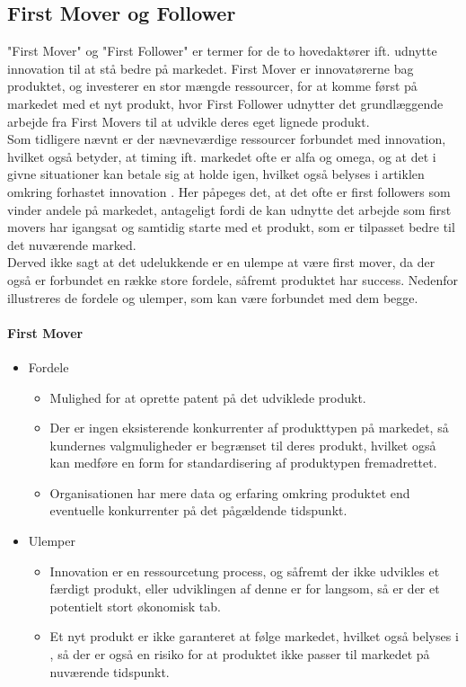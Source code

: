 \subsection{First Mover og Follower}
"First Mover" og "First Follower" er termer for de to hovedaktører ift. udnytte innovation til at stå bedre på markedet.
First Mover er innovatørerne bag produktet, og investerer en stor mængde ressourcer, for at komme først på markedet med et nyt produkt, hvor First Follower udnytter det grundlæggende arbejde fra First Movers til at udvikle deres eget lignede produkt.
\\Som tidligere nævnt er der nævneværdige ressourcer forbundet med innovation, hvilket
også betyder, at timing ift. markedet ofte er alfa og omega, og at det i givne situationer kan betale sig at holde igen, hvilket også belyses i artiklen omkring forhastet innovation \cite[a.1]{eksamensopgave}.
Her påpeges det, at det ofte er first followers som vinder andele på markedet, antageligt fordi de kan udnytte det arbejde som first movers har igangsat og samtidig starte med et produkt, som er tilpasset bedre til det nuværende marked.\\
Derved ikke sagt at det udelukkende er en ulempe at være first mover, da der også er forbundet en række store fordele, såfremt produktet har success. Nedenfor illustreres de fordele og ulemper, som kan være forbundet med dem begge.
\paragraph{First Mover}
\begin{itemize}
    \item Fordele
    \begin{itemize}
        \item Mulighed for at oprette patent på det udviklede produkt.
        \item Der er ingen eksisterende konkurrenter af produkttypen på markedet, så kundernes valgmuligheder er begrænset til deres produkt, hvilket også kan medføre en form for standardisering af produktypen fremadrettet.
        \item Organisationen har mere data og erfaring omkring produktet end eventuelle konkurrenter på det pågældende tidspunkt.
    \end{itemize}
    \item Ulemper
    \begin{itemize}
        \item Innovation er en ressourcetung process, og såfremt der ikke udvikles et færdigt produkt, eller udviklingen af denne er for langsom, så er der et potentielt stort økonomisk tab.
        \item Et nyt produkt er ikke garanteret at følge markedet, hvilket også belyses i \cite[a.1]{eksamensopgave}, så der er også en risiko for at produktet ikke passer til markedet på nuværende tidspunkt.
    \end{itemize}
\end{itemize}
